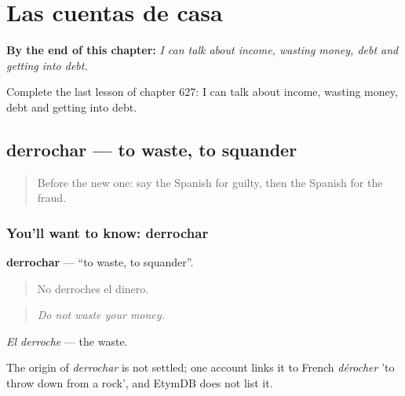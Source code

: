 
\chapter{Las cuentas de casa}
\label{ch:es-las-cuentas-de-casa}

\begin{chapteropening}
\textbf{By the end of this chapter:} \emph{I can talk about income, wasting money, debt and getting into debt.}

Complete the last lesson of chapter 627: I can talk about income, wasting money, debt and getting into debt.
\end{chapteropening}

\section[derrochar]{derrochar — to waste, to squander}

\label{lesson:ES-C627-derrochar}



\begin{quote}
Before the new one: say the Spanish for guilty, then the Spanish for the fraud.
\end{quote}

\subsection*{You'll want to know: derrochar}
\textbf{derrochar} — \textquotedblleft{}to waste, to squander\textquotedblright{}.

\begin{quote}
No derroches el dinero.
\end{quote}

\begin{quote}
\emph{Do not waste your money.}
\end{quote}

\emph{El derroche} — the waste.

\begin{cousinweb}
The origin of \emph{derrochar} is not settled; one account links it to French \emph{dérocher} 'to throw down from a rock', and EtymDB does not list it.
\end{cousinweb}

